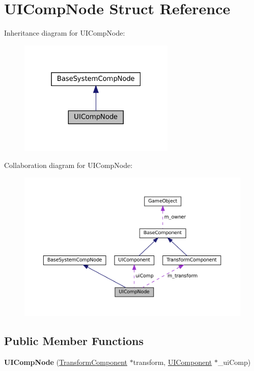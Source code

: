 \hypertarget{structUICompNode}{}\section{U\+I\+Comp\+Node Struct Reference}
\label{structUICompNode}


Inheritance diagram for U\+I\+Comp\+Node\+:
\nopagebreak
\begin{figure}[H]
\begin{center}
\leavevmode
\includegraphics[width=211pt]{structUICompNode__inherit__graph}
\end{center}
\end{figure}


Collaboration diagram for U\+I\+Comp\+Node\+:
\nopagebreak
\begin{figure}[H]
\begin{center}
\leavevmode
\includegraphics[width=350pt]{structUICompNode__coll__graph}
\end{center}
\end{figure}
\subsection*{Public Member Functions}
\begin{DoxyCompactItemize}
\item 
\mbox{\label{structUICompNode_af2be0cd4fddb312a597d1f96c78431fe}} 
{\bfseries U\+I\+Comp\+Node} (\hyperlink{classTransformComponent}{Transform\+Component} $\ast$transform, \hyperlink{classUIComponent}{U\+I\+Component} $\ast$\+\_\+ui\+Comp)
\end{DoxyCompactItemize}
